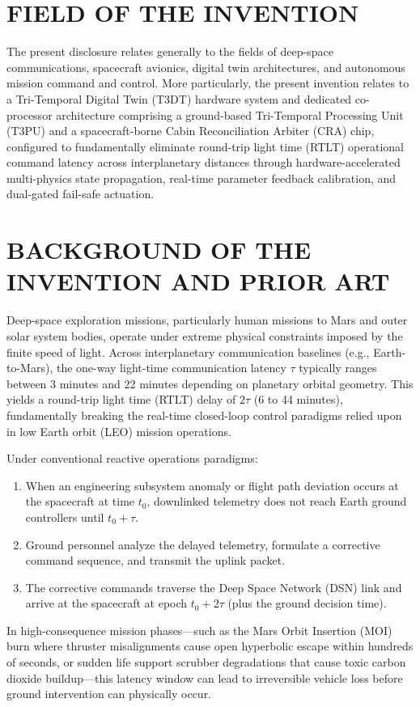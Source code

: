 \documentclass[12pt,a4paper]{article}
\begin{document}
\section*{FIELD OF THE INVENTION}
The present disclosure relates generally to the fields of deep-space communications, spacecraft avionics, digital twin architectures, and autonomous mission command and control. More particularly, the present invention relates to a Tri-Temporal Digital Twin (T3DT) hardware system and dedicated co-processor architecture comprising a ground-based Tri-Temporal Processing Unit (T3PU) and a spacecraft-borne Cabin Reconciliation Arbiter (CRA) chip, configured to fundamentally eliminate round-trip light time (RTLT) operational command latency across interplanetary distances through hardware-accelerated multi-physics state propagation, real-time parameter feedback calibration, and dual-gated fail-safe actuation.

\section*{BACKGROUND OF THE INVENTION AND PRIOR ART}
Deep-space exploration missions, particularly human missions to Mars and outer solar system bodies, operate under extreme physical constraints imposed by the finite speed of light. Across interplanetary communication baselines (e.g., Earth-to-Mars), the one-way light-time communication latency $\tau$ typically ranges between 3 minutes and 22 minutes depending on planetary orbital geometry. This yields a round-trip light time (RTLT) delay of $2\tau$ (6 to 44 minutes), fundamentally breaking the real-time closed-loop control paradigms relied upon in low Earth orbit (LEO) mission operations.

Under conventional reactive operations paradigms:
\begin{enumerate}
    \item When an engineering subsystem anomaly or flight path deviation occurs at the spacecraft at time $t_0$, downlinked telemetry does not reach Earth ground controllers until $t_0 + \tau$.
    \item Ground personnel analyze the delayed telemetry, formulate a corrective command sequence, and transmit the uplink packet.
    \item The corrective commands traverse the Deep Space Network (DSN) link and arrive at the spacecraft at epoch $t_0 + 2\tau$ (plus the ground decision time).
\end{enumerate}
In high-consequence mission phases—such as the Mars Orbit Insertion (MOI) burn where thruster misalignments cause open hyperbolic escape within hundreds of seconds, or sudden life support scrubber degradations that cause toxic carbon dioxide buildup—this latency window can lead to irreversible vehicle loss before ground intervention can physically occur.
\end{document}
